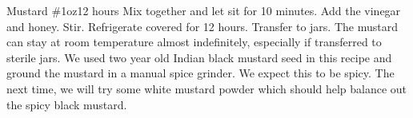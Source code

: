 \begin{recipe}{Mustard \#1}{\unit[12]{oz}}{12 hours}
Mix together and let sit for 10 minutes.
Add the vinegar and honey. Stir.  Refrigerate covered for 12 hours.  Transfer to jars. 
\freeform The mustard can stay at room temperature almost indefinitely, especially if transferred to sterile jars. We used two year old Indian black mustard seed in this recipe and ground the mustard in a manual spice grinder. We expect this to be spicy. The next time, we will try some white mustard powder which should help balance out the spicy black mustard.
\end{recipe}
